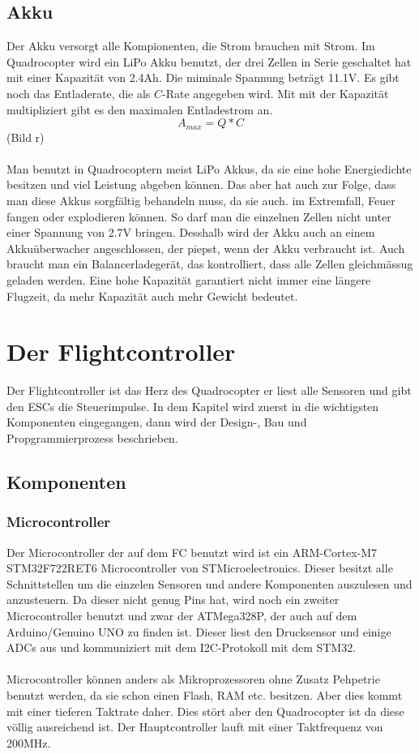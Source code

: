 \documentclass[12pt,a4paper, ngerman]{article}
\begin{document}
\subsection{Akku}
Der Akku versorgt alle Kompionenten, die Strom brauchen mit Strom. Im Quadrocopter wird ein LiPo Akku benutzt, der drei Zellen in Serie geschaltet hat mit einer Kapazität von 2.4Ah. Die miminale Spannung beträgt 11.1V. Es gibt noch das Entladerate, die als $C$-Rate angegeben wird. Mit mit der Kapazität multipliziert gibt es den maximalen Entladestrom an.\cite{website:fpvracing.ch_Mult_Komp}
\begin{equation}
A_{max}=Q*C
\end{equation} (Bild r)\\ \\
Man benutzt in Quadrocoptern meist LiPo Akkus, da sie eine hohe Energiedichte besitzen und viel Leistung abgeben können. Das aber hat auch zur Folge, dass man diese Akkus sorgfältig behandeln muss, da sie auch. im Extremfall, Feuer fangen oder explodieren können. So darf man die einzelnen Zellen nicht unter einer Spannung von 2.7V bringen. Desshalb wird der Akku auch an einem Akkuüberwacher angeschlossen, der piepst, wenn der Akku verbraucht ist. Auch braucht man ein Balancerladegerät, das kontrolliert, dass alle Zellen gleichmässug geladen werden. Eine hohe Kapazität garantiert nicht immer eine längere Flugzeit, da mehr Kapazität auch mehr Gewicht bedeutet.
\newpage

\section{Der Flightcontroller}
Der Flightcontroller ist das Herz des Quadrocopter er liest alle Sensoren und gibt den ESCs die Steuerimpulse. In dem Kapitel wird zuerst in die wichtigsten Komponenten eingegangen, dann wird der Design-, Bau und Propgrammierprozess beschrieben.
\subsection{Komponenten}
\subsubsection{Microcontroller}
Der Microcontroller der auf dem FC benutzt wird ist ein ARM-Cortex-M7 STM32F722RET6 Microcontroller von STMicroelectronics. Dieser besitzt alle Schnittstellen um die einzelen Sensoren und andere Komponenten auszulesen und anzusteuern. Da dieser nicht genug Pins hat, wird noch ein zweiter Microcontroller benutzt und zwar der ATMega328P, der auch auf dem Arduino/Genuino UNO zu finden ist. Dieser liest den Drucksensor und einige ADCs aus und kommuniziert mit dem I2C-Protokoll mit dem STM32. \\ \\
Microcontroller können anders als Mikroprozessoren ohne Zusatz Pehpetrie benutzt werden, da sie schon einen Flash, RAM etc. besitzen. Aber dies kommt mit einer tieferen Taktrate daher. Dies stört aber den Quadrocopter ist da diese völlig ausreichend ist. Der Hauptcontroller lauft mit einer Taktfrequenz von 200MHz.
\end{document}
